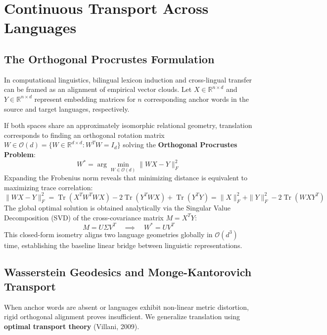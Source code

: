 \documentclass[11pt,letterpaper]{article}
\begin{document}
\section{Continuous Transport Across Languages}

\subsection{The Orthogonal Procrustes Formulation}
In computational linguistics, bilingual lexicon induction and cross-lingual transfer can be framed as an alignment of empirical vector clouds. Let $X \in \mathbb{R}^{n \times d}$ and $Y \in \mathbb{R}^{n \times d}$ represent embedding matrices for $n$ corresponding anchor words in the source and target languages, respectively.

If both spaces share an approximately isomorphic relational geometry, translation corresponds to finding an orthogonal rotation matrix $W \in \mathcal{O}(d) = \{W \in \mathbb{R}^{d \times d} : W^T W = I_d\}$ solving the \textbf{Orthogonal Procrustes Problem}:
\begin{equation}
W^* = \arg\min_{W \in \mathcal{O}(d)} \| W X - Y \|_F^2
\end{equation}
Expanding the Frobenius norm reveals that minimizing distance is equivalent to maximizing trace correlation:
\begin{equation}
\| W X - Y \|_F^2 = \operatorname{Tr}(X^T W^T W X) - 2 \operatorname{Tr}(Y^T W X) + \operatorname{Tr}(Y^T Y) = \|X\|_F^2 + \|Y\|_F^2 - 2 \operatorname{Tr}(W X Y^T)
\end{equation}
The global optimal solution is obtained analytically via the Singular Value Decomposition (SVD) of the cross-covariance matrix $M = X^T Y$:
\begin{equation}
M = U \Sigma V^T \quad \implies \quad W^* = U V^T
\end{equation}
This closed-form isometry aligns two language geometries globally in $\mathcal{O}(d^3)$ time, establishing the baseline linear bridge between linguistic representations.

\subsection{Wasserstein Geodesics and Monge-Kantorovich Transport}
When anchor words are absent or languages exhibit non-linear metric distortion, rigid orthogonal alignment proves insufficient. We generalize translation using \textbf{optimal transport theory} (Villani, 2009).
\end{document}
